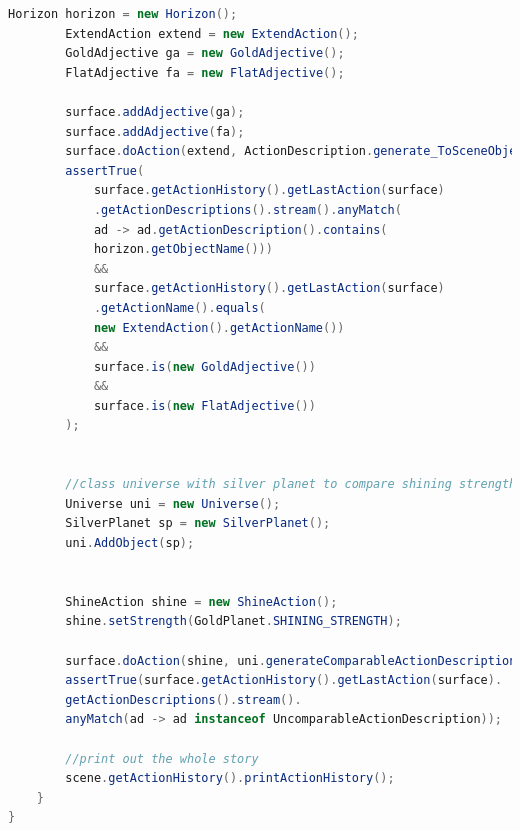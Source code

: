 \begin{lstlisting}[language=java]
		Horizon horizon = new Horizon();
		ExtendAction extend = new ExtendAction();
		GoldAdjective ga = new GoldAdjective();
		FlatAdjective fa = new FlatAdjective();
		
		surface.addAdjective(ga);
		surface.addAdjective(fa);
		surface.doAction(extend, ActionDescription.generate_ToSceneObject_Description(horizon), ActionDescription.generate_ToPlace_Description(DestinationEnum.all_sides));
		assertTrue(
			surface.getActionHistory().getLastAction(surface)
			.getActionDescriptions().stream().anyMatch(
			ad -> ad.getActionDescription().contains(
			horizon.getObjectName()))
			&&
			surface.getActionHistory().getLastAction(surface)
			.getActionName().equals(
			new ExtendAction().getActionName())
			&&
			surface.is(new GoldAdjective())
			&&
			surface.is(new FlatAdjective())
		);
		
		
		//class universe with silver planet to compare shining strength to
		Universe uni = new Universe();
		SilverPlanet sp = new SilverPlanet();
		uni.AddObject(sp);
		
		
		ShineAction shine = new ShineAction();
		shine.setStrength(GoldPlanet.SHINING_STRENGTH);
		
		surface.doAction(shine, uni.generateComparableActionDescription(new GoldPlanet(), shine, new ShineAction()));
		assertTrue(surface.getActionHistory().getLastAction(surface).
		getActionDescriptions().stream().
		anyMatch(ad -> ad instanceof UncomparableActionDescription));
		
		//print out the whole story
		scene.getActionHistory().printActionHistory();
	}
}
\end{lstlisting}
